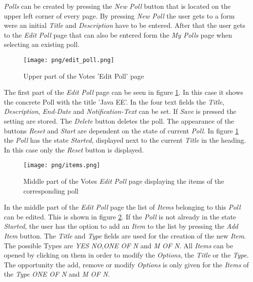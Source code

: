 \textit{Polls} can be created by pressing the \textit{New Poll} button that is located on the upper left corner of every page. By pressing \textit{New Poll} the user gets to a form were an initial \textit{Title} and \textit{Description} have to be entered. After that the user gets to the \textit{Edit Poll} page that can also be entered form the \textit{My Polls} page when selecting an existing poll.

\begin{figure}
\centering
\texttt{[image: png/edit\_poll.png]}
\caption{Upper part of the Votes 'Edit Poll' page}
\label{F:edit_poll}
\end{figure}

The first part of the \textit{Edit Poll} page can be seen in figure \ref{F:edit_poll}. In this case it shows the concrete Poll with the title 'Java EE'. In the four text fields the \textit{Title}, \textit{Description}, \textit{End-Date} and \textit{Notification-Text} can be set. If \textit{Save} is pressed the setting are stored. The \textit{Delete} button deletes the poll. The appearance of the buttons \textit{Reset} and \textit{Start} are dependent on the state of current \textit{Poll}. In figure \ref{F:edit_poll} the \textit{Poll} has the state \textit{Started}, displayed next to the current \textit{Title} in the heading. In this case only the \textit{Reset} button is displayed.  

\begin{figure}
\centering
\texttt{[image: png/items.png]}
\caption{Middle part of the Votes \textit{Edit Poll} page displaying the items of the corresponding poll}
\label{F:items}
\end{figure}

In the middle part of the \textit{Edit Poll} page the list of \textit{Items} belonging to this \textit{Poll} can be edited. This is shown in figure \ref*{F:items}. If the \textit{Poll} is not already in the state \textit{Started}, the user has the option to add an \textit{Item} to the list by pressing the \textit{Add Item} button. The \textit{Title} and \textit{Type} fields are used for the creation of the new \textit{Item}. The possible Types are \textit{YES NO},\textit{ONE OF N} and \textit{M OF N}. All \textit{Items} can be opened by clicking on them in order to modify the \textit{Options}, the \textit{Title} or the \textit{Type}. The opportunity the add, remove or modify \textit{Options} is only given for the \textit{Items} of the \textit{Type} \textit{ONE OF N} and \textit{M OF N}.

